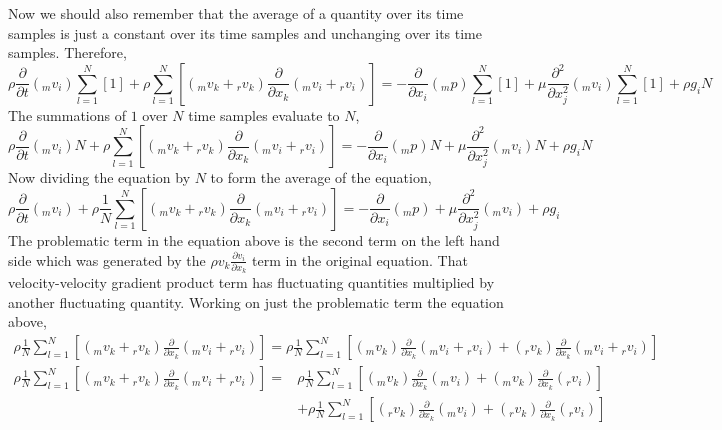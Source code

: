 Now we should also remember that the average of a quantity over its time samples is just a constant over its time samples and unchanging over its time samples. Therefore,
$$\rho\frac{\partial }{\partial t}({}_{m}v_{i})\sum^{N}_{l = 1}\left[1\right] + \rho\sum^{N}_{l = 1}\left[({}_{m}v_{k} + {}_{r}v_{k})\frac{\partial }{\partial x_{k}}({}_{m}v_{i} + {}_{r}v_{i})\right]  = -\frac{\partial }{\partial x_{i}}({}_{m}p)\sum^{N}_{l = 1}\left[1\right] + \mu \frac{\partial^{2} }{\partial x_{j}^{2}}({}_{m}v_{i})\sum^{N}_{l = 1}\left[1\right] + \rho g_{i}N $$
The summations of $1$ over $N$ time samples evaluate to $N$,
$$\rho\frac{\partial }{\partial t}({}_{m}v_{i})N + \rho\sum^{N}_{l = 1}\left[({}_{m}v_{k} + {}_{r}v_{k})\frac{\partial }{\partial x_{k}}({}_{m}v_{i} + {}_{r}v_{i})\right]  = -\frac{\partial }{\partial x_{i}}({}_{m}p)N + \mu \frac{\partial^{2} }{\partial x_{j}^{2}}({}_{m}v_{i})N + \rho g_{i}N $$
Now dividing the equation by $N$ to form the average of the equation,
\begin{equation}
\rho\frac{\partial }{\partial t}({}_{m}v_{i}) + \rho\frac{1}{N}\sum^{N}_{l = 1}\left[({}_{m}v_{k} + {}_{r}v_{k})\frac{\partial }{\partial x_{k}}({}_{m}v_{i} + {}_{r}v_{i})\right]  = -\frac{\partial }{\partial x_{i}}({}_{m}p) + \mu \frac{\partial^{2} }{\partial x_{j}^{2}}({}_{m}v_{i}) + \rho g_{i} 
\label{RANS Momentum Primitive 1}
\end{equation}
The problematic term in the equation above is the second term on the left hand side which was generated by the $\displaystyle \rho v_{k}\frac{\partial v_{i}}{\partial x_{k}}$ term in the original equation.
That velocity-velocity gradient product term has fluctuating quantities multiplied by another fluctuating quantity.
Working on just the problematic term the equation above,
\begin{align*}\rho\frac{1}{N}\sum^{N}_{l = 1}\left[({}_{m}v_{k} + {}_{r}v_{k})\frac{\partial }{\partial x_{k}}({}_{m}v_{i} + {}_{r}v_{i})\right] = \rho\frac{1}{N}\sum^{N}_{l = 1}\left[({}_{m}v_{k})\frac{\partial }{\partial x_{k}}({}_{m}v_{i} + {}_{r}v_{i}) + ({}_{r}v_{k})\frac{\partial }{\partial x_{k}}({}_{m}v_{i} + {}_{r}v_{i})\right]\end{align*}
\begin{align*}
\rho\frac{1}{N}\sum^{N}_{l = 1}\left[({}_{m}v_{k} + {}_{r}v_{k})\frac{\partial }{\partial x_{k}}({}_{m}v_{i} + {}_{r}v_{i})\right] = &
\rho\frac{1}{N}\sum^{N}_{l = 1}\left[({}_{m}v_{k})\frac{\partial }{\partial x_{k}}({}_{m}v_{i}) + ({}_{m}v_{k})\frac{\partial }{\partial x_{k}}({}_{r}v_{i})\right]  
\\ &+ \rho\frac{1}{N}\sum^{N}_{l = 1}\left[({}_{r}v_{k})\frac{\partial }{\partial x_{k}}({}_{m}v_{i}) + ({}_{r}v_{k})\frac{\partial }{\partial x_{k}}({}_{r}v_{i})\right]
\end{align*}
